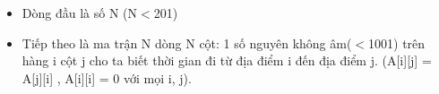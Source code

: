 \begin{itemize}
	\item Dòng đầu là số N (N$<$201)
	\item Tiếp theo là ma trận N dòng N cột: 1 số nguyên không âm($<$1001) trên hàng i cột j cho ta biết thời gian đi từ địa điểm i đến địa điểm j. (A[i][j] = A[j][i] , A[i][i] = 0 với mọi i, j).
\end{itemize}